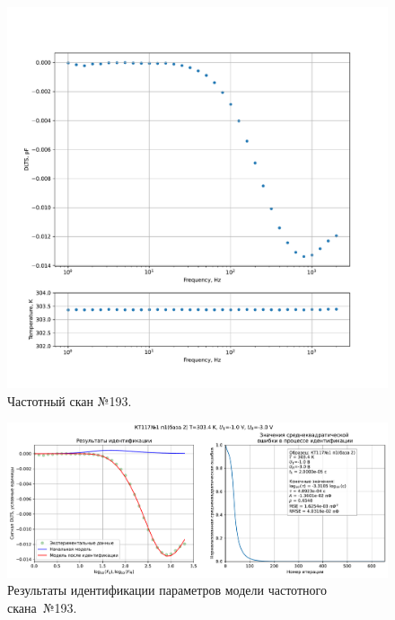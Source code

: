 \begin{figure}[!ht]
    \centering
    \includegraphics[width=1\textwidth]{../plots/КТ117№1_п1(база 2)_2500Гц-1Гц_1пФ_+30С_-1В-3В_200мВ_20мкс_шаг_0,1.pdf}
    \caption{Частотный скан №193.}
    \label{pic:frequency_scan_193}
\end{figure}

\begin{figure}[!ht]
    \centering
    \includegraphics[width=1\textwidth]{../plots/КТ117№1_п1(база 2)_2500Гц-1Гц_1пФ_+30С_-1В-3В_200мВ_20мкс_шаг_0,1_model.pdf}
    \caption{Результаты идентификации параметров модели частотного скана~№193.}
    \label{pic:frequency_scan_model193}
\end{figure}

\pagebreak


